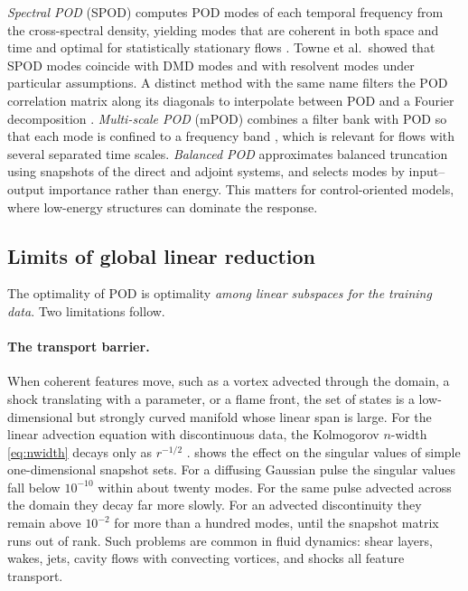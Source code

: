 \emph{Spectral POD} (SPOD) computes POD modes of each temporal frequency from
the cross-spectral density, yielding modes that are coherent in both space and
time and optimal for statistically stationary flows
\parencite{towne2018spod,schmidt2020guide}. Towne et al.\ showed that SPOD modes
coincide with DMD modes and with resolvent modes
\parencite{mckeon2010critical} under particular assumptions. A distinct method
with the same name filters the POD correlation matrix along its diagonals to
interpolate between POD and a Fourier decomposition \parencite{sieber2016spod}.
\emph{Multi-scale POD} (mPOD) combines a filter bank with POD so that each
mode is confined to a frequency band \parencite{mendez2019mpod}, which is
relevant for flows with several separated time scales.
\emph{Balanced POD} \parencite{rowley2005bpod} approximates balanced truncation
\parencite{moore1981} using snapshots of the direct and adjoint systems, and
selects modes by input--output importance rather than energy. This matters
for control-oriented models, where low-energy structures can dominate the
response.

\subsection{Limits of global linear reduction}
\label{sec:barrier}

The optimality of POD is optimality \emph{among linear subspaces for the
training data}. Two limitations follow.

\paragraph{The transport barrier.}
When coherent features move, such as a vortex advected through the domain, a
shock translating with a parameter, or a flame front, the set of states is a
low-dimensional but strongly curved manifold whose linear span is large. For
the linear advection equation with discontinuous data, the Kolmogorov $n$-width
\eqref{eq:nwidth} decays only as $r^{-1/2}$
\parencite{ohlberger2016reduced,greif2019decay}.  shows the
effect on the singular values of simple one-dimensional snapshot sets. For a
diffusing Gaussian pulse the singular values fall below $10^{-10}$ within
about twenty modes. For the same pulse advected across the domain they decay
far more slowly. For an advected discontinuity they remain above $10^{-2}$ for
more than a hundred modes, until the snapshot matrix runs out of rank. Such
problems are common in fluid dynamics: shear layers, wakes, jets, cavity
flows with convecting vortices, and shocks all feature transport.

